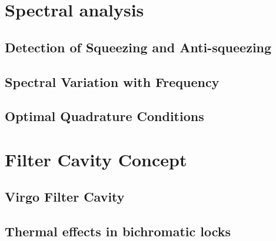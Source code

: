 \section{Spectral analysis}
\subsection{Detection of Squeezing and Anti-squeezing}
\subsection{Spectral Variation with Frequency}
\subsection{Optimal Quadrature Conditions}
\section{Filter Cavity Concept}
\subsection{Virgo Filter Cavity }
\subsection{Thermal effects in bichromatic locks}
